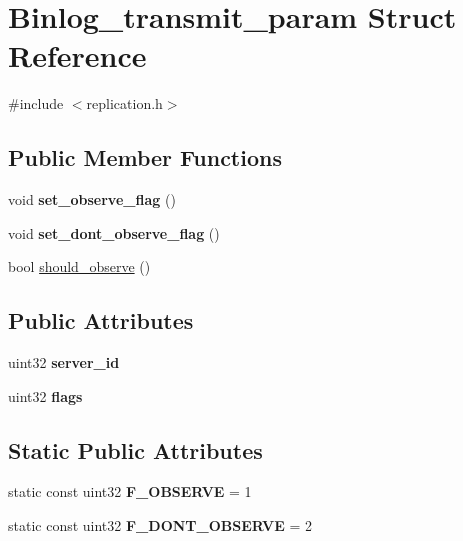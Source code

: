 \hypertarget{structBinlog__transmit__param}{}\section{Binlog\+\_\+transmit\+\_\+param Struct Reference}
\label{structBinlog__transmit__param}


{\ttfamily \#include $<$replication.\+h$>$}

\subsection*{Public Member Functions}
\begin{DoxyCompactItemize}
\item 
\mbox{\label{structBinlog__transmit__param_a572904c508be567689b529520c549109}} 
void {\bfseries set\+\_\+observe\+\_\+flag} ()
\item 
\mbox{\label{structBinlog__transmit__param_a78b85994540bbb892743a5b9bb56eef0}} 
void {\bfseries set\+\_\+dont\+\_\+observe\+\_\+flag} ()
\item 
bool \mbox{\hyperlink{structBinlog__transmit__param_a2de96979dea739113c6d0df8ff53d336}{should\+\_\+observe}} ()
\end{DoxyCompactItemize}
\subsection*{Public Attributes}
\begin{DoxyCompactItemize}
\item 
\mbox{\label{structBinlog__transmit__param_aa4f19c982335666a8e8065a507babcfe}} 
uint32 {\bfseries server\+\_\+id}
\item 
\mbox{\label{structBinlog__transmit__param_ae9b6a5843969db1fb0cdde1eb50fc70a}} 
uint32 {\bfseries flags}
\end{DoxyCompactItemize}
\subsection*{Static Public Attributes}
\begin{DoxyCompactItemize}
\item 
\mbox{\label{structBinlog__transmit__param_a6f0a92ca69a1ad4628c56cd3e5520250}} 
static const uint32 {\bfseries F\+\_\+\+O\+B\+S\+E\+R\+VE} = 1
\item 
\mbox{\label{structBinlog__transmit__param_a0edbd1952453a9dce3853ea0c6b13b6c}} 
static const uint32 {\bfseries F\+\_\+\+D\+O\+N\+T\+\_\+\+O\+B\+S\+E\+R\+VE} = 2
\end{DoxyCompactItemize}


